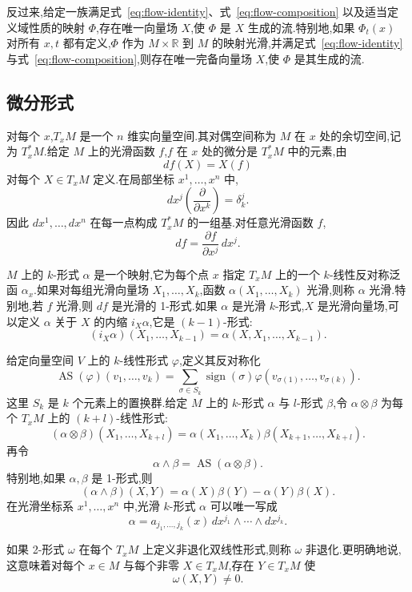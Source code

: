 反过来,给定一族满足式~\eqref{eq:flow-identity}、式~\eqref{eq:flow-composition} 以及适当定义域性质的映射 $\Phi$,存在唯一向量场 $X$,使 $\Phi$ 是 $X$ 生成的流.特别地,如果 $\Phi_t(x)$ 对所有 $x,t$ 都有定义,$\Phi$ 作为 $M\times\mathbb R$ 到 $M$ 的映射光滑,并满足式~\eqref{eq:flow-identity} 与式~\eqref{eq:flow-composition},则存在唯一完备向量场 $X$,使 $\Phi$ 是其生成的流.

\subsection{微分形式}
\label{subsec:differential-forms}

对每个 $x$,$T_xM$ 是一个 $n$ 维实向量空间.其对偶空间称为 $M$ 在 $x$ 处的余切空间,记为 $T_x^*M$.给定 $M$ 上的光滑函数 $f$,$f$ 在 $x$ 处的微分是 $T_x^*M$ 中的元素,由
\[
 df(X)=X(f)
\]
对每个 $X\in T_xM$ 定义.在局部坐标 $x^1,\ldots,x^n$ 中,
\[
 dx^j\left(\frac{\partial}{\partial x^k}\right)=\delta^j_k.
\]
因此 $dx^1,\ldots,dx^n$ 在每一点构成 $T_x^*M$ 的一组基.对任意光滑函数 $f$,
\[
 df=\frac{\partial f}{\partial x^j}\,dx^j.\label{eq:manifold-differential}
\]

$M$ 上的 $k$-形式 $\alpha$ 是一个映射,它为每个点 $x$ 指定 $T_xM$ 上的一个 $k$-线性反对称泛函 $\alpha_x$.如果对每组光滑向量场 $X_1,\ldots,X_k$,函数 $\alpha(X_1,\ldots,X_k)$ 光滑,则称 $\alpha$ 光滑.特别地,若 $f$ 光滑,则 $df$ 是光滑的 1-形式.如果 $\alpha$ 是光滑 $k$-形式,$X$ 是光滑向量场,可以定义 $\alpha$ 关于 $X$ 的内缩 $i_X\alpha$,它是 $(k-1)$-形式:
\[
 (i_X\alpha)(X_1,\ldots,X_{k-1})
 =\alpha(X,X_1,\ldots,X_{k-1}).
\]

给定向量空间 $V$ 上的 $k$-线性形式 $\varphi$,定义其反对称化
\[
 \operatorname{AS}(\varphi)(v_1,\ldots,v_k)
 =\sum_{\sigma\in S_k}\operatorname{sign}(\sigma)
 \varphi(v_{\sigma(1)},\ldots,v_{\sigma(k)}).
\]
这里 $S_k$ 是 $k$ 个元素上的置换群.给定 $M$ 上的 $k$-形式 $\alpha$ 与 $l$-形式 $\beta$,令 $\alpha\otimes\beta$ 为每个 $T_xM$ 上的 $(k+l)$-线性形式:
\[
 (\alpha\otimes\beta)(X_1,\ldots,X_{k+l})
 =\alpha(X_1,\ldots,X_k)\beta(X_{k+1},\ldots,X_{k+l}).
\]
再令
\[
 \alpha\wedge\beta=\operatorname{AS}(\alpha\otimes\beta).
\]
特别地,如果 $\alpha,\beta$ 是 1-形式,则
\[
 (\alpha\wedge\beta)(X,Y)
 =\alpha(X)\beta(Y)-\alpha(Y)\beta(X).
\]
在光滑坐标系 $x^1,\ldots,x^n$ 中,光滑 $k$-形式 $\alpha$ 可以唯一写成
\[
 \alpha=a_{j_1,\ldots,j_k}(x)\,
 dx^{j_1}\wedge\cdots\wedge dx^{j_k}.
\]

如果 2-形式 $\omega$ 在每个 $T_xM$ 上定义非退化双线性形式,则称 $\omega$ 非退化.更明确地说,这意味着对每个 $x\in M$ 与每个非零 $X\in T_xM$,存在 $Y\in T_xM$ 使
\[
 \omega(X,Y)\ne0.
\]

